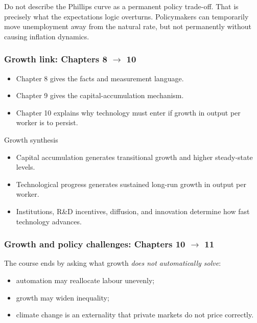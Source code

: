 \documentclass[12pt]{article}
\begin{document}
\begin{commonmistake}
Do not describe the Phillips curve as a permanent policy trade-off. That is precisely what the expectations logic overturns. Policymakers can temporarily move unemployment away from the natural rate, but not permanently without causing inflation dynamics.
\end{commonmistake}

\subsubsection*{Growth link: Chapters 8 \texorpdfstring{$\to$}{to} 10}

\begin{itemize}[leftmargin=1.5em]
    \item Chapter 8 gives the facts and measurement language.
    \item Chapter 9 gives the capital-accumulation mechanism.
    \item Chapter 10 explains why technology must enter if growth in output per worker is to persist.
\end{itemize}

\begin{theorem}{Growth synthesis}{}
\begin{itemize}[leftmargin=1.5em]
    \item Capital accumulation generates transitional growth and higher steady-state levels.
    \item Technological progress generates sustained long-run growth in output per worker.
    \item Institutions, R\&D incentives, diffusion, and innovation determine how fast technology advances.
\end{itemize}
\end{theorem}

\subsubsection*{Growth and policy challenges: Chapters 10 \texorpdfstring{$\to$}{to} 11}

The course ends by asking what growth \emph{does not automatically solve}:
\begin{itemize}[leftmargin=1.5em]
    \item automation may reallocate labour unevenly;
    \item growth may widen inequality;
    \item climate change is an externality that private markets do not price correctly.
\end{itemize}
\end{document}
